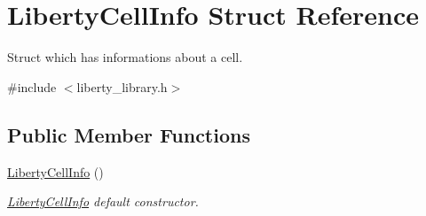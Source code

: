 \hypertarget{structLibertyCellInfo}{\section{Liberty\-Cell\-Info Struct Reference}
\label{structLibertyCellInfo}
}


Struct which has informations about a cell.  




{\ttfamily \#include $<$liberty\-\_\-library.\-h$>$}

\subsection*{Public Member Functions}
\begin{DoxyCompactItemize}
\item 
\hyperlink{structLibertyCellInfo_a3250ab70b0c778ef0881b949c008814b}{Liberty\-Cell\-Info} ()
\begin{DoxyCompactList}\small\item\em \hyperlink{structLibertyCellInfo}{Liberty\-Cell\-Info} default constructor. \end{DoxyCompactList}\end{DoxyCompactItemize}
